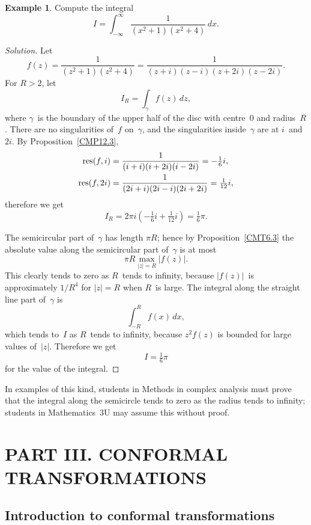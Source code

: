 \documentclass{amsproc}
\theoremstyle{definition}
\newtheorem{example}[theorem]{Example}
\newenvironment{solution}{\begin{proof}[Solution]}{\end{proof}}
\theoremstyle{remark}
\DeclareMathOperator{\res}{\textup{res}}
\numberwithin{equation}{section}
\begin{document}
\begin{example} \label{CME13.2}
Compute the integral
$$
I = \int_{-\infty}^\infty \dfrac{1}{(x^2 + 1)(x^2 + 4)}\,dx.
$$
\end{example}

\begin{solution}
Let
$$
f(z) = \dfrac{1}{(z^2 + 1)(z^2 + 4)} = \dfrac{1}{(z + i)(z - i)(z + 2i)(z - 2i)}.
$$
For $ R > 2 $, let
$$
I_R = \int_\gamma f(z)\,dz,
$$
where $ \gamma $~is the boundary of the upper half of the disc with centre~$ 0 $ and radius~$ R $. There are no singularities of~$ f $ on~$ \gamma $, and the singularities
inside~$ \gamma $ are at $ i $~and~$ 2i $. By Proposition~\ref{CMP12.3},
\begin{align*}
\res(f,i) &= \dfrac{1}{(i + i)(i + 2i)(i - 2i)} = -\tfrac{1}{6}i, \\
\res(f,2i) &= \dfrac{1}{(2i + i)(2i - i)(2i + 2i)} = \tfrac{1}{12}i,
\end{align*}
therefore we get
$$
I_R = 2\pi i(-\tfrac{1}{6}i + \tfrac{1}{12}i) = \tfrac{1}{6}\pi.
$$

The semicircular part of~$ \gamma $ has length $ \pi R $; hence by Proposition~\ref{CMT6.3} the absolute value along the semicircular part of~$ \gamma $ is at most
$$
\pi R \max_{|z| = R} |f(z)|.
$$
This clearly tends to zero as $ R $~tends to infinity, because $ |f(z)| $~is approximately $ 1/R^4 $ for $ |z| = R $ when $ R $~is large. The integral along the straight line
part of~$ \gamma $ is
$$
\int_{-R}^R f(x)\,dx,
$$
which tends to~$ I $ as $ R $~tends to infinity, because $ z^2 f(z) $ is bounded for large values of~$ |z| $. Therefore we get
$$
I = \tfrac{1}{6}\pi
$$
for the value of the integral.
\end{solution}

In examples of this kind, students in Methods in complex analysis must prove that the integral along the semicircle tends to zero as the radius tends to infinity; students
in Mathematics~3U may assume this without proof.

\vfill\pagebreak


\section*{PART III. CONFORMAL TRANSFORMATIONS}

\subsection{Introduction to conformal transformations} \label{CMS14}
\end{document}
